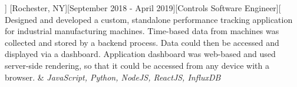 \documentclass[showluaboxes=false]{resume}
\begin{document}
%
		]%
		[Rochester, NY][September 2018 - April 2019][Controls Software Engineer][%
		Designed and developed a custom, standalone performance tracking application for industrial manufacturing machines. Time-based data from machines was collected and stored by a backend process. Data could then be accessed and displayed via a dashboard. Application dashboard was web-based and used server-side rendering, so that it could be accessed from any device with a browser.%
		&%
		{\it JavaScript, Python, NodeJS, ReactJS, InfluxDB}%
\end{document}
